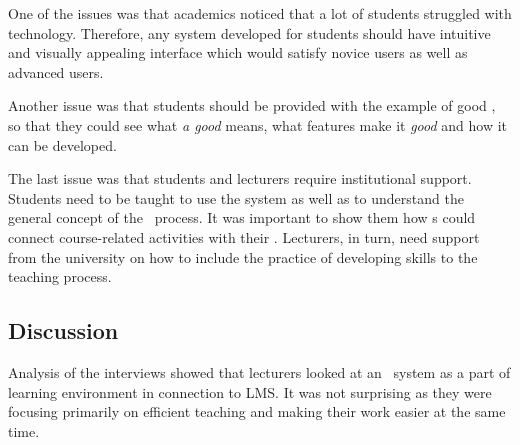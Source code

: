 One of the issues was that academics noticed that a lot of students struggled
with technology. Therefore, any system developed for students should have
intuitive and visually appealing interface which would satisfy novice users as
well as advanced users.



Another issue was that students should be provided with the example of good
\ep, so that they could see what \textit{a good \ep} means, what features make
it \textit{good} and how it can be developed.


The last issue was that students and lecturers require institutional support.
Students need to be taught to use the system as well as to understand the
general concept of the \ep~process. It was important to show them how \ep s
could connect course-related activities with their \LLLsn. Lecturers, in turn,
need support from the university on how to include the practice of developing
\LLLs skills to the teaching process.

 
\subsection{Discussion}
Analysis of the interviews showed that lecturers looked at an \ep~system as a
part of learning environment in connection to LMS. It was not surprising as they
were focusing primarily on efficient teaching and making their work easier at
the same time.

